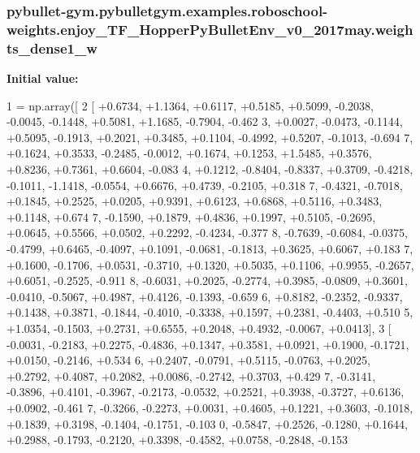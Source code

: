 \subsubsection[{\texorpdfstring{weights\+\_\+dense1\+\_\+w}{weights_dense1_w}}]{\setlength{\rightskip}{0pt plus 5cm}pybullet-\/gym.\+pybulletgym.\+examples.\+roboschool-\/weights.\+enjoy\+\_\+\+T\+F\+\_\+\+Hopper\+Py\+Bullet\+Env\+\_\+v0\+\_\+2017may.\+weights\+\_\+dense1\+\_\+w}\hypertarget{namespacepybullet-gym_1_1pybulletgym_1_1examples_1_1roboschool-weights_1_1enjoy___t_f___hopper_py_bullet_env__v0__2017may_ae8b90ae7b2735e0ad5b4c6d9f72c54c5}{}\label{namespacepybullet-gym_1_1pybulletgym_1_1examples_1_1roboschool-weights_1_1enjoy___t_f___hopper_py_bullet_env__v0__2017may_ae8b90ae7b2735e0ad5b4c6d9f72c54c5}
{\bfseries Initial value\+:}
\begin{DoxyCode}
1 = np.array([
2 [ +0.6734, +1.1364, +0.6117, +0.5185, +0.5099, -0.2038, -0.0045, -0.1448, +0.5081, +1.1685, -0.7904, -0.462
      3, +0.0027, -0.0473, -0.1144, +0.5095, -0.1913, +0.2021, +0.3485, +0.1104, -0.4992, +0.5207, -0.1013, -0.694
      7, +0.1624, +0.3533, -0.2485, -0.0012, +0.1674, +0.1253, +1.5485, +0.3576, +0.8236, +0.7361, +0.6604, -0.083
      4, +0.1212, -0.8404, -0.8337, +0.3709, -0.4218, -0.1011, -1.1418, -0.0554, +0.6676, +0.4739, -0.2105, +0.318
      7, -0.4321, -0.7018, +0.1845, +0.2525, +0.0205, +0.9391, +0.6123, +0.6868, +0.5116, +0.3483, +0.1148, +0.674
      7, -0.1590, +0.1879, +0.4836, +0.1997, +0.5105, -0.2695, +0.0645, +0.5566, +0.0502, +0.2292, -0.4234, -0.377
      8, -0.7639, -0.6084, -0.0375, -0.4799, +0.6465, -0.4097, +0.1091, -0.0681, -0.1813, +0.3625, +0.6067, +0.183
      7, +0.1600, -0.1706, +0.0531, -0.3710, +0.1320, +0.5035, +0.1106, +0.9955, -0.2657, +0.6051, -0.2525, -0.911
      8, -0.6031, +0.2025, -0.2774, +0.3985, -0.0809, +0.3601, -0.0410, -0.5067, +0.4987, +0.4126, -0.1393, -0.659
      6, +0.8182, -0.2352, -0.9337, +0.1438, +0.3871, -0.1844, -0.4010, -0.3338, +0.1597, +0.2381, -0.4403, +0.510
      5, +1.0354, -0.1503, +0.2731, +0.6555, +0.2048, +0.4932, -0.0067, +0.0413],
3 [ -0.0031, -0.2183, +0.2275, -0.4836, +0.1347, +0.3581, +0.0921, +0.1900, -0.1721, +0.0150, -0.2146, +0.534
      6, +0.2407, -0.0791, +0.5115, -0.0763, +0.2025, +0.2792, +0.4087, +0.2082, +0.0086, -0.2742, +0.3703, +0.429
      7, -0.3141, -0.3896, +0.4101, -0.3967, -0.2173, -0.0532, +0.2521, +0.3938, -0.3727, +0.6136, +0.0902, -0.461
      7, -0.3266, -0.2273, +0.0031, +0.4605, +0.1221, +0.3603, -0.1018, +0.1839, +0.3198, -0.1404, -0.1751, -0.103
      0, -0.5847, +0.2526, -0.1280, +0.1644, +0.2988, -0.1793, -0.2120, +0.3398, -0.4582, +0.0758, -0.2848, -0.153

\end{DoxyCode}
